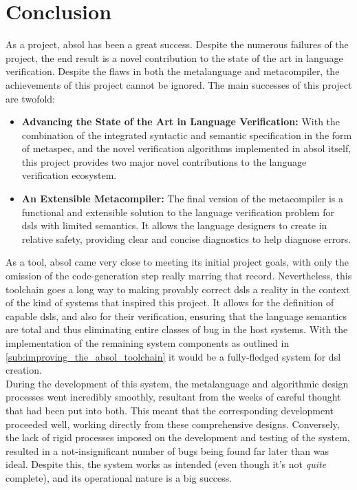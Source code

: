 \chapter{Conclusion} %
\label{cha:conclusion}
As a project, \gls{absol} has been a great success.
Despite the numerous failures of the project, the end result is a novel contribution to the state of the art in language verification. 
Despite the flaws in both the metalanguage and metacompiler, the achievements of this project cannot be ignored. 
The main successes of this project are twofold:
\begin{itemize}
    \item \textbf{Advancing the State of the Art in Language Verification:} With the combination of the integrated syntactic and semantic specification in the form of \gls{metaspec}, and the novel verification algorithms implemented in \gls{absol} itself, this project provides two major novel contributions to the language verification ecosystem.
    \item \textbf{An Extensible Metacompiler:} The final version of the metacompiler is a functional and extensible solution to the language verification problem for \glspl{dsl} with limited semantics.
    It allows the language designers to create in relative safety, providing clear and concise diagnostics to help diagnose errors.
\end{itemize}

As a tool, \gls{absol} came very close to meeting its initial project goals, with only the omission of the code-generation step really marring that record. 
Nevertheless, this toolchain goes a long way to making provably correct \glspl{dsl} a reality in the context of the kind of systems that inspired this project.
It allows for the definition of capable \glspl{dsl}, and also for their verification, ensuring that the language semantics are total and thus eliminating entire classes of bug in the host systems.
With the implementation of the remaining system components as outlined in \autoref{sub:improving_the_absol_toolchain} it would be a fully-fledged system for \gls{dsl} creation.\\

During the development of this system, the metalanguage and algorithmic design processes went incredibly smoothly, resultant from the weeks of careful thought that had been put into both. 
This meant that the corresponding development proceeded well, working directly from these comprehensive designs.
Conversely, the lack of rigid processes imposed on the development and testing of the system, resulted in a not-insignificant number of bugs being found far later than was ideal.
Despite this, the system works as intended (even though it's not \textit{quite} complete), and its operational nature is a big success. \\

